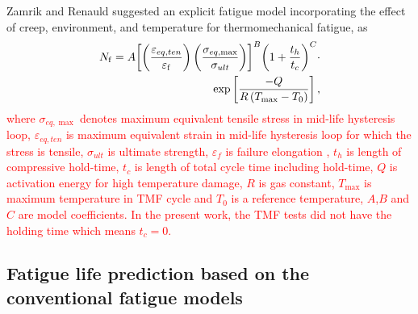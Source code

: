 \documentclass[preprint,5p,twocolumn,11pt,sort&compress]{elsarticle}
\newcommand{\marked}[1]{\textcolor{red}{#1}}
\begin{document}
Zamrik and Renauld \cite{Zamrik2000} suggested an explicit fatigue model incorporating the effect of creep, environment, and temperature for thermomechanical fatigue, as
\begin{equation}
\begin{aligned}
{N_{\rm f}} = A{\left[ {\left( {\frac{{{\varepsilon _{eq,ten}}}}{{{\varepsilon _{\rm f}}}}} \right)\left( {\frac{{{\sigma _{eq,\max }}}}{{{\sigma _{ult}}}}} \right)} \right]^B} 
{\left( {1 + \frac{{{t_h}}}{{{t_c}}}} \right)^C}\cdot \\
\exp \left[ {\frac{{ - Q}}{{R\left( {{T_{\max }} - {T_0}} \right)}}} \right],
\end{aligned}
\label{Equ:StudyModel}
\end{equation}
\marked{
where $\sigma _{eq,\max }$ denotes maximum equivalent tensile stress in mid-life hysteresis loop, $\varepsilon _{eq,ten}$ is maximum equivalent strain in mid-life hysteresis loop for which the stress is tensile, $\sigma _{ult}$ is ultimate strength, $\varepsilon _{f}$ is failure elongation , $t_h$ is length of compressive hold-time, $t_c$ is length of total cycle time including hold-time, $Q$ is activation energy for high temperature damage, $R$ is gas constant, $T_{\max}$ is maximum temperature in TMF cycle and $T_0$ is a reference temperature, $A$,$B$ and $C$ are model coefficients. In the present work, the TMF tests did not have the holding time which means $t_c=0$.}

\subsection{Fatigue life prediction based on the conventional fatigue models}
\end{document}
